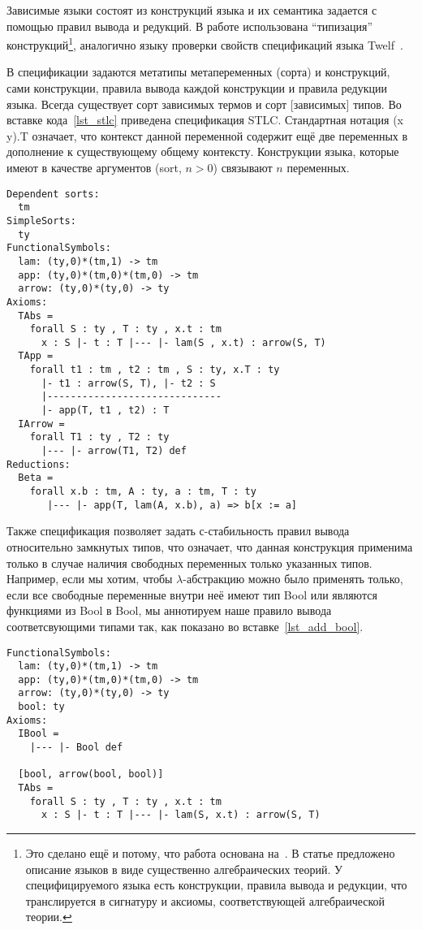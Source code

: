 Зависимые языки состоят из конструкций языка и их семантика задается с помощью правил вывода и редукций. В работе использована ``типизация'' конструкций\footnote{Это сделано ещё и потому, что работа основана на~\cite{isaev}. В статье предложено описание языков в виде существенно алгебраических теорий. У специфицируемого языка есть конструкции, правила вывода и редукции, что транслируется в сигнатуру и аксиомы, соответствующей алгебраической теории.}, аналогично языку проверки свойств спецификаций языка Twelf~\cite{twelf}.

В спецификации задаются метатипы метапеременных (сорта) и конструкций, сами конструкции, правила вывода каждой конструкции и правила редукции языка. Всегда существует сорт зависимых термов и сорт [зависимых] типов. Во вставке кода~\ref{lst_stlc} приведена спецификация STLC\cite{stlc}. Стандартная нотация (x y).T означает, что контекст данной переменной содержит ещё две переменных в дополнение к существующему общему контексту. Конструкции языка, которые имеют в качестве аргументов (sort, $n > 0$) связывают $n$ переменных.

\begin{lstlisting}[label={lst_stlc}, caption={Описание STLC при помощи языка специфкаций},captionpos=b, frame=single, float, floatplacement=H]
Dependent sorts:
  tm
SimpleSorts:
  ty
FunctionalSymbols:
  lam: (ty,0)*(tm,1) -> tm
  app: (ty,0)*(tm,0)*(tm,0) -> tm
  arrow: (ty,0)*(ty,0) -> ty
Axioms:
  TAbs =
    forall S : ty , T : ty , x.t : tm
      x : S |- t : T |--- |- lam(S , x.t) : arrow(S, T)
  TApp =
    forall t1 : tm , t2 : tm , S : ty, x.T : ty
      |- t1 : arrow(S, T), |- t2 : S
      |------------------------------
      |- app(T, t1 , t2) : T
  IArrow =
    forall T1 : ty , T2 : ty
      |--- |- arrow(T1, T2) def
Reductions:
  Beta =
    forall x.b : tm, A : ty, a : tm, T : ty
       |--- |- app(T, lam(A, x.b), a) => b[x := a]
\end{lstlisting}

Также спецификация позволяет задать с-стабильность правил вывода относительно замкнутых типов, что означает, что данная конструкция применима только в случае наличия свободных переменных только указанных типов. Например, если мы хотим, чтобы $\lambda$-абстракцию можно было применять только, если все свободные переменные внутри неё имеют тип Bool или являются функциями из Bool в Bool, мы аннотируем наше правило вывода соответсвующими типами так, как показано во вставке~\ref{lst_add_bool}.

\begin{lstlisting}[label={lst_add_bool}, caption={Пример спецификации того, что конструкция $\lambda$ должна быть стабильна относительно типа Bool и Bool $\rightarrow$ Bool},captionpos=b, frame=single, float, floatplacement=H]
FunctionalSymbols:
  lam: (ty,0)*(tm,1) -> tm
  app: (ty,0)*(tm,0)*(tm,0) -> tm
  arrow: (ty,0)*(ty,0) -> ty
  bool: ty
Axioms:
  IBool =
    |--- |- Bool def

  [bool, arrow(bool, bool)]
  TAbs =
    forall S : ty , T : ty , x.t : tm
      x : S |- t : T |--- |- lam(S, x.t) : arrow(S, T)
\end{lstlisting}

